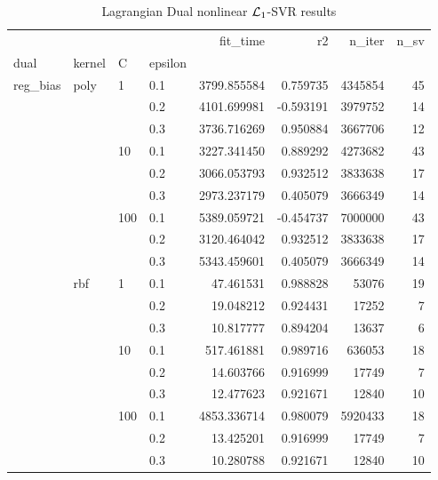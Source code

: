 \begin{table}[H]
\centering
\caption{Lagrangian Dual nonlinear $\protect \mathcal{L}_1$-SVR results}
\label{nonlinear_lagrangian_dual_l1_svr_cv_results}
\begin{tabular}{llllrrrr}
\toprule
           &     &     &     &     fit\_time &        r2 &   n\_iter &  n\_sv \\
dual & kernel & C & epsilon &              &           &          &       \\
\midrule
reg\_bias & poly & 1   & 0.1 &  3799.855584 &  0.759735 &  4345854 &    45 \\
           &     &     & 0.2 &  4101.699981 & -0.593191 &  3979752 &    14 \\
           &     &     & 0.3 &  3736.716269 &  0.950884 &  3667706 &    12 \\
           &     & 10  & 0.1 &  3227.341450 &  0.889292 &  4273682 &    43 \\
           &     &     & 0.2 &  3066.053793 &  0.932512 &  3833638 &    17 \\
           &     &     & 0.3 &  2973.237179 &  0.405079 &  3666349 &    14 \\
           &     & 100 & 0.1 &  5389.059721 & -0.454737 &  7000000 &    43 \\
           &     &     & 0.2 &  3120.464042 &  0.932512 &  3833638 &    17 \\
           &     &     & 0.3 &  5343.459601 &  0.405079 &  3666349 &    14 \\
           & rbf & 1   & 0.1 &    47.461531 &  0.988828 &    53076 &    19 \\
           &     &     & 0.2 &    19.048212 &  0.924431 &    17252 &     7 \\
           &     &     & 0.3 &    10.817777 &  0.894204 &    13637 &     6 \\
           &     & 10  & 0.1 &   517.461881 &  0.989716 &   636053 &    18 \\
           &     &     & 0.2 &    14.603766 &  0.916999 &    17749 &     7 \\
           &     &     & 0.3 &    12.477623 &  0.921671 &    12840 &    10 \\
           &     & 100 & 0.1 &  4853.336714 &  0.980079 &  5920433 &    18 \\
           &     &     & 0.2 &    13.425201 &  0.916999 &    17749 &     7 \\
           &     &     & 0.3 &    10.280788 &  0.921671 &    12840 &    10 \\

\end{tabular}
\end{table}

